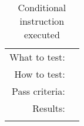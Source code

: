 \begin{table}[H]
  \begin{tabular}{r | p{8cm}}
    \noalign{\smallskip}\hline\noalign{\smallskip}
    
    What to test:  &  \\

    \noalign{\smallskip}\hline\noalign{\smallskip}

    How to test:   & \\

    \noalign{\smallskip}\hline\noalign{\smallskip}

    Pass criteria: & \\

    \noalign{\smallskip}\hline\noalign{\smallskip}
    
    Results: &  \\
   \noalign{\smallskip}\hline\noalign{\smallskip}
  
  
  
  \end{tabular}
  \caption{Conditional instruction executed }
  \label{testing:fitness:pipeline_test}
\end{table}
